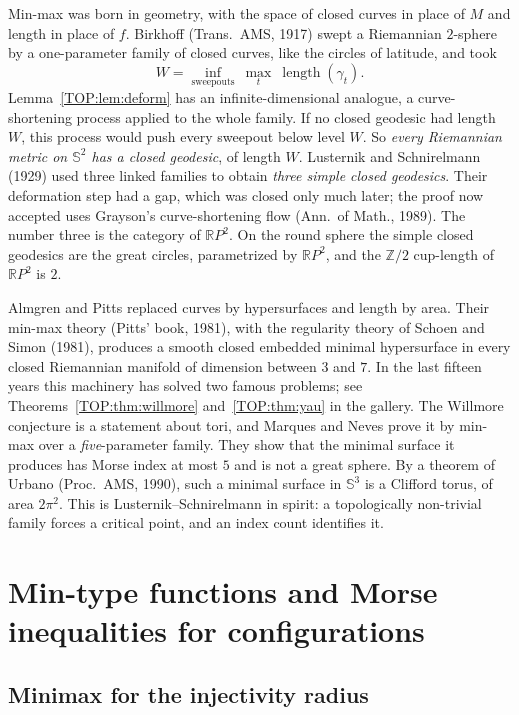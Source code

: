\documentclass[11pt,openany]{book}
\theoremstyle{plain}
\theoremstyle{definition}
\theoremstyle{remark}
\newcommand{\R}{\mathbb{R}}
\newcommand{\Z}{\mathbb{Z}}
\newcommand{\Sph}{\mathbb{S}}          %
\begin{document}
Min-max was born in geometry, with the space of closed curves in place of $M$ and length in place
of $f$. Birkhoff (Trans.\ AMS, 1917) swept a Riemannian $2$-sphere by a one-parameter family of closed
curves, like the circles of latitude, and took
\[
  W=\inf_{\text{sweepouts}}\ \max_t\ \operatorname{length}(\gamma_t).
\]
Lemma~\ref{TOP:lem:deform} has an infinite-dimensional analogue, a curve-shortening process applied to the
whole family. If no closed geodesic had length $W$, this process would push every sweepout below level
$W$. So \emph{every Riemannian metric on $\Sph^2$ has a closed geodesic}, of length $W$. Lusternik and
Schnirelmann (1929) used three linked families to obtain \emph{three simple closed geodesics}. Their
deformation step had a gap, which was closed only much later; the proof now accepted uses Grayson's
curve-shortening flow (Ann.\ of Math., 1989). The number three is the category of $\R P^2$. On the round
sphere the simple closed geodesics are the great circles, parametrized by $\R P^2$, and the $\Z/2$
cup-length of $\R P^2$ is $2$.

Almgren and Pitts replaced curves by hypersurfaces and length by area. Their min-max theory (Pitts' book,
1981), with the regularity theory of Schoen and Simon (1981), produces a smooth closed embedded minimal
hypersurface in every closed Riemannian manifold of dimension between $3$ and $7$. In the last fifteen
years this machinery has solved two famous problems; see Theorems~\ref{TOP:thm:willmore}
and~\ref{TOP:thm:yau} in the gallery. The Willmore conjecture is a statement about tori, and Marques and Neves
prove it by min-max over a \emph{five}-parameter family. They show that the minimal surface it produces
has Morse index at most $5$ and is not a great sphere. By a theorem of Urbano (Proc.\ AMS, 1990), such a
minimal surface in $\Sph^3$ is a Clifford torus, of area $2\pi^2$. This is Lusternik--Schnirelmann in spirit: a topologically non-trivial family forces a
critical point, and an index count identifies it.

\section{Min-type functions and Morse inequalities for configurations}
\label{TOP:sec:mintype}

\subsection{Minimax for the injectivity radius}
\end{document}
